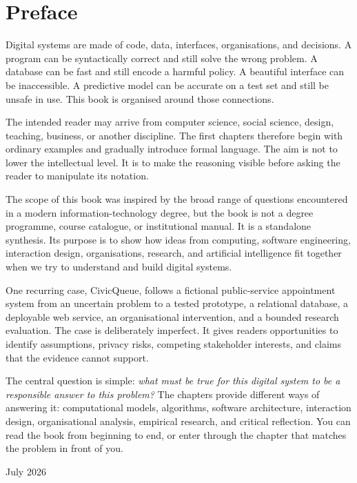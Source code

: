 \chapter*{Preface}

Digital systems are made of code, data, interfaces, organisations, and decisions. A program can be syntactically correct and still solve the wrong problem. A database can be fast and still encode a harmful policy. A beautiful interface can be inaccessible. A predictive model can be accurate on a test set and still be unsafe in use. This book is organised around those connections.

The intended reader may arrive from computer science, social science, design, teaching, business, or another discipline. The first chapters therefore begin with ordinary examples and gradually introduce formal language. The aim is not to lower the intellectual level. It is to make the reasoning visible before asking the reader to manipulate its notation.

The scope of this book was inspired by the broad range of questions encountered in a modern information-technology degree, but the book is not a degree programme, course catalogue, or institutional manual. It is a standalone synthesis. Its purpose is to show how ideas from computing, software engineering, interaction design, organisations, research, and artificial intelligence fit together when we try to understand and build digital systems.

One recurring case, CivicQueue, follows a fictional public-service appointment system from an uncertain problem to a tested prototype, a relational database, a deployable web service, an organisational intervention, and a bounded research evaluation. The case is deliberately imperfect. It gives readers opportunities to identify assumptions, privacy risks, competing stakeholder interests, and claims that the evidence cannot support.

The central question is simple: \emph{what must be true for this digital system to be a responsible answer to this problem?} The chapters provide different ways of answering it: computational models, algorithms, software architecture, interaction design, organisational analysis, empirical research, and critical reflection. You can read the book from beginning to end, or enter through the chapter that matches the problem in front of you.

\vfill
\begin{flushright}
July 2026
\end{flushright}
